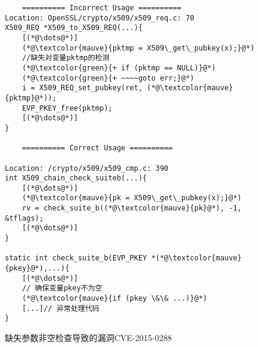 \begin{figure}
	\centering
	\begin{minipage}[t]{0.8\linewidth}
\begin{lstlisting}
	========== Incorrect Usage ==========
Location: OpenSSL/crypto/x509/x509_req.c: 70
X509_REQ *X509_to_X509_REQ(...){
	[(*@\dots@*)]
	(*@\textcolor{mauve}{pktmp = X509\_get\_pubkey(x);}@*)
	//缺失对变量pktmp的检测
	(*@\textcolor{green}{+ if (pktmp == NULL)}@*)
	(*@\textcolor{green}{+ ~~~~goto err;}@*)
	i = X509_REQ_set_pubkey(ret, (*@\textcolor{mauve}{pktmp}@*));
	EVP_PKEY_free(pktmp);
	[(*@\dots@*)]
}

	========== Correct Usage ==========

Location: /crypto/x509/x509_cmp.c: 390
int X509_chain_check_suiteb(...){
	[(*@\dots@*)]
	(*@\textcolor{mauve}{pk = X509\_get\_pubkey(x);}@*)
	rv = check_suite_b((*@\textcolor{mauve}{pk}@*), -1, &tflags);
	[(*@\dots@*)]
} 

static int check_suite_b(EVP_PKEY *(*@\textcolor{mauve}{pkey}@*),...){
	[(*@\dots@*)]
	// 确保变量pkey不为空
	(*@\textcolor{mauve}{if (pkey \&\& ...)}@*)
	[...]// 异常处理代码
}
\end{lstlisting}
	\caption{
	缺失参数非空检查导致的漏洞CVE-2015-0288~\cite{CVE-2015-0288}
	}
	\label{fig:1-1-example}
	\end{minipage}
\end{figure}